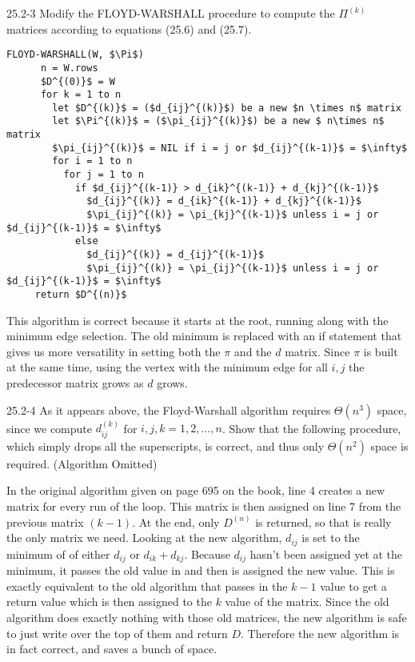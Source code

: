 \newpage
\begin{problem}{25.2-3}
  Modify the FLOYD-WARSHALL procedure to compute the $\Pi^{(k)}$ matrices according to equations (25.6) and (25.7).
  \begin{solution}
    \begin{lstlisting}[mathescape]
      FLOYD-WARSHALL(W, $\Pi$)
      n = W.rows
      $D^{(0)}$ = W
      for k = 1 to n
        let $D^{(k)}$ = ($d_{ij}^{(k)}$) be a new $n \times n$ matrix
        let $\Pi^{(k)}$ = ($\pi_{ij}^{(k)}$) be a new $ n\times n$ matrix
        $\pi_{ij}^{(k)}$ = NIL if i = j or $d_{ij}^{(k-1)}$ = $\infty$ 
        for i = 1 to n
          for j = 1 to n
            if $d_{ij}^{(k-1)} > d_{ik}^{(k-1)} + d_{kj}^{(k-1)}$
              $d_{ij}^{(k)} = d_{ik}^{(k-1)} + d_{kj}^{(k-1)}$
              $\pi_{ij}^{(k)} = \pi_{kj}^{(k-1)}$ unless i = j or $d_{ij}^{(k-1)}$ = $\infty$
            else
              $d_{ij}^{(k)} = d_{ij}^{(k-1)}$
              $\pi_{ij}^{(k)} = \pi_{ij}^{(k-1)}$ unless i = j or $d_{ij}^{(k-1)}$ = $\infty$
     return $D^{(n)}$
    \end{lstlisting}
  \end{solution}
  \br
  This algorithm is correct because it starts at the root, running along with the minimum edge selection. The old
  minimum is replaced with an if statement that gives us more versatility in setting both the $\pi$ and the $d$ matrix.
  Since $\pi$ is built at the same time, using the vertex with the minimum edge for all $i,j$ the predecessor matrix
  grows as $d$ grows.
\end{problem}

\begin{problem}{25.2-4}
  As it appears above, the Floyd-Warshall algorithm requires $\Theta(n^3)$ space, since we compute $d_{ij}^{(k)}$ for
  $i, j, k = 1, 2, \ldots, n$. Show that the following procedure, which simply drops all the superscripts, is correct,
  and thus only $\Theta(n^2)$ space is required.
  \br
  (Algorithm Omitted)
  \begin{solution}
    In the original algorithm given on page 695 on the book, line 4 creates a new matrix for every run of the loop.
    This matrix is then assigned on line 7 from the previous matrix $(k - 1)$.
    \br
    At the end, only $D^{(n)}$ is returned, so that is really the only matrix we need.
    \br
    Looking at the new algorithm, $d_{ij}$ is set to the minimum of of either $d_{ij}$ or $d_{ik} + d_{kj}$. Because 
    $d_{ij}$ hasn't been assigned yet at the minimum, it passes the old value in and then is assigned the new value.
    This is exactly equivalent to the old algorithm that passes in the $k - 1$ value to get a return value which is then
    assigned to the $k$ value of the matrix.
    \br
    Since the old algorithm does exactly nothing with those old matrices, the new algorithm is safe to just write over
    the top of them and return $D$.
    \br
    Therefore the new algorithm is in fact correct, and saves a bunch of space.
  \end{solution}
\end{problem}

